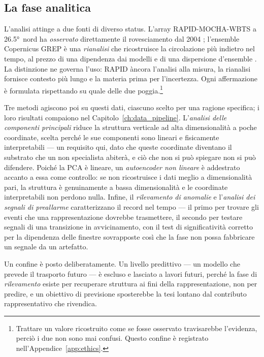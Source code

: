 \subsection{La fase analitica}
\label{subsec:analytical}

L'analisi attinge a due fonti di diverso status. L'array RAPID-MOCHA-WBTS a \ang{26.5}~nord ha \emph{osservato} direttamente il rovesciamento dal 2004 \citep{frajkawilliams2021, moat2026}; l'ensemble Copernicus GREP è una \emph{rianalisi} che ricostruisce la circolazione più indietro nel tempo, al prezzo di una dipendenza dai modelli e di una dispersione d'ensemble \citep{copernicus_grep}. La distinzione ne governa l'uso: RAPID àncora l'analisi alla misura, la rianalisi fornisce contesto più lungo e la materia prima per l'incertezza. Ogni affermazione è formulata rispettando su quale delle due poggia.\footnote{Trattare un valore ricostruito come se fosse osservato travisarebbe l'evidenza, perciò i due non sono mai confusi. Questo confine è registrato nell'Appendice~\ref{app:ethics}.}

Tre metodi agiscono poi su questi dati, ciascuno scelto per una ragione specifica; i loro risultati compaiono nel Capitolo~\ref{ch:data_pipeline}. L'\emph{analisi delle componenti principali} riduce la struttura verticale ad alta dimensionalità a poche coordinate, scelta perché le sue componenti sono lineari e fisicamente interpretabili --- un requisito qui, dato che queste coordinate diventano il substrato che un non specialista abiterà, e ciò che non si può spiegare non si può difendere. Poiché la PCA è lineare, un \emph{autoencoder non lineare} è addestrato accanto a essa come controllo: se non ricostruisce i dati meglio a dimensionalità pari, la struttura è genuinamente a bassa dimensionalità e le coordinate interpretabili non perdono nulla. Infine, il \emph{rilevamento di anomalie} e l'\emph{analisi dei segnali di preallarme} caratterizzano il record nel tempo --- il primo per trovare gli eventi che una rappresentazione dovrebbe trasmettere, il secondo per testare segnali di una transizione in avvicinamento, con il test di significatività corretto per la dipendenza delle finestre sovrapposte così che la fase non possa fabbricare un segnale da un artefatto.

Un confine è posto deliberatamente. Un livello predittivo --- un modello che prevede il trasporto futuro --- è escluso e lasciato a lavori futuri, perché la fase di \emph{rilevamento} esiste per recuperare struttura ai fini della rappresentazione, non per predire, e un obiettivo di previsione sposterebbe la tesi lontano dal contributo rappresentativo che rivendica.

